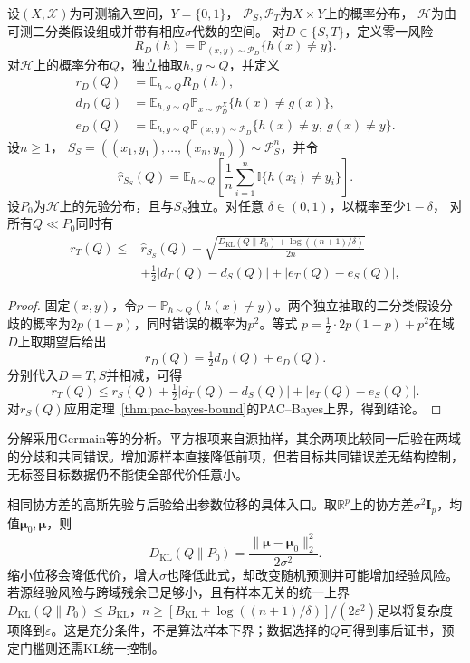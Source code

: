 \begin{theorem}[参数分布的跨域期望风险界]
\label{thm:transfer-pac-bayes}
设$(X,\mathcal X)$为可测输入空间，$Y=\{0,1\}$，
$\mathcal P_S,\mathcal P_T$为$X\times Y$上的概率分布，
$\mathcal H$为由可测二分类假设组成并带有相应$\sigma$代数的空间。
对$D\in\{S,T\}$，定义零一风险
\[
 R_D(h)=\mathbb P_{(x,y)\sim\mathcal P_D}\{h(x)\neq y\}.
\]
对$\mathcal H$上的概率分布$Q$，独立抽取$h,g\sim Q$，并定义
\[
 \begin{aligned}
 r_D(Q)&=\mathbb E_{h\sim Q}R_D(h),\\
 d_D(Q)&=\mathbb E_{h,g\sim Q}
 \mathbb P_{x\sim\mathcal P_D^X}\{h(x)\neq g(x)\},\\
 e_D(Q)&=\mathbb E_{h,g\sim Q}
 \mathbb P_{(x,y)\sim\mathcal P_D}
 \{h(x)\neq y,\ g(x)\neq y\}.
 \end{aligned}
\]
设$n\geq1$，
$S_S=((x_1,y_1),\ldots,(x_n,y_n))\sim\mathcal P_S^n$，并令
\[
 \widehat r_{S_S}(Q)=\mathbb E_{h\sim Q}
 \left[\frac1n\sum_{i=1}^n\mathbb I\{h(x_i)\neq y_i\}\right].
\]
设$P_0$为$\mathcal H$上的先验分布，且与$S_S$独立。对任意
$\delta\in(0,1)$，以概率至少$1-\delta$，
对所有$Q\ll P_0$同时有
\begin{equation}
 \begin{aligned}
 r_T(Q)\leq{}&\widehat r_{S_S}(Q)
 +\sqrt{\frac{D_{\mathrm{KL}}(Q\|P_0)+\log((n+1)/\delta)}{2n}}\\
 &+\tfrac12|d_T(Q)-d_S(Q)|+|e_T(Q)-e_S(Q)|,
 \end{aligned}
 \label{eq:transfer-pac-bayes}
\end{equation}
\end{theorem}
\begin{proof}
固定$(x,y)$，令$p=\mathbb P_{h\sim Q}(h(x)\neq y)$。两个独立抽取的二分类假设分歧的概率为$2p(1-p)$，同时错误的概率为$p^2$。等式
$p=\tfrac12\cdot2p(1-p)+p^2$在域$D$上取期望后给出
\[
 r_D(Q)=\tfrac12d_D(Q)+e_D(Q).
\]
分别代入$D=T,S$并相减，可得
\[
 r_T(Q)\leq r_S(Q)+\tfrac12|d_T(Q)-d_S(Q)|+|e_T(Q)-e_S(Q)|.
\]
对$r_S(Q)$应用定理~\ref{thm:pac-bayes-bound}的PAC--Bayes上界，得到结论。
\end{proof}

分解采用Germain等的分析。平方根项来自源抽样，其余两项比较同一后验在两域的分歧和共同错误。增加源样本直接降低前项，但若目标共同错误差无结构控制，无标签目标数据仍不能使全部代价任意小。

相同协方差的高斯先验与后验给出参数位移的具体入口。取$\mathbb R^p$上的协方差$\sigma^2\bm I_p$，均值$\bm\mu_0,\bm\mu$，则
\[
 D_{\mathrm{KL}}(Q\|P_0)=\frac{\|\bm\mu-\bm\mu_0\|_2^2}{2\sigma^2}.
\]
缩小位移会降低代价，增大$\sigma$也降低此式，却改变随机预测并可能增加经验风险。若源经验风险与跨域残余已足够小，且有样本无关的统一上界$D_{\mathrm{KL}}(Q\|P_0)\leq B_{\mathrm{KL}}$，$n\geq[B_{\mathrm{KL}}+\log((n+1)/\delta)]/(2\varepsilon^2)$足以将复杂度项降到$\varepsilon$。这是充分条件，不是算法样本下界；数据选择的$Q$可得到事后证书，预定门槛则还需KL统一控制。

